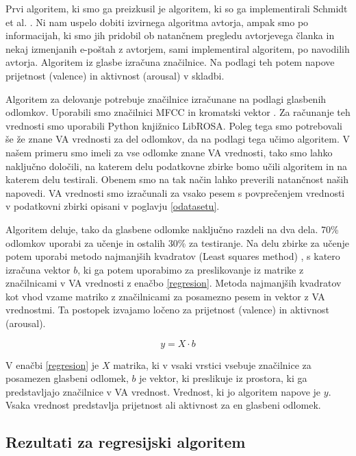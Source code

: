 \documentclass[a4paper, 12pt]{book}
\begin{document}
{Prvi algoritem, ki smo ga preizkusil je algoritem, ki so ga implementirali Schmidt et al. \cite{schmidt2009projection}. Ni nam uspelo dobiti izvirnega algoritma avtorja, ampak smo po informacijah, ki smo jih pridobil ob natančnem pregledu avtorjevega članka in nekaj izmenjanih e-poštah z avtorjem, sami implementiral algoritem, po navodilih avtorja. Algoritem iz glasbe izračuna značilnice. Na podlagi teh potem napove prijetnost (valence) in aktivnost (arousal) v skladbi. 

Algoritem za delovanje potrebuje značilnice izračunane na podlagi glasbenih odlomkov. Uporabili smo značilnici MFCC \cite{logan2000mel} in kromatski vektor \cite{Bello2005}. Za računanje teh vrednosti smo uporabili Python knjižnico LibROSA. Poleg tega smo potrebovali še že znane VA vrednosti za del odlomkov, da na podlagi tega učimo algoritem. V našem primeru smo imeli za vse odlomke znane VA vrednosti, tako smo lahko naključno določili, na katerem delu podatkovne zbirke bomo učili algoritem in na katerem delu testirali. Obenem smo na tak način lahko preverili natančnost naših napovedi. VA vrednosti smo izračunali za vsako pesem s povprečenjem vrednosti v podatkovni zbirki opisani v poglavju \ref{odatasetu}.

Algoritem deluje, tako da glasbene odlomke naključno razdeli na dva dela. 70\% odlomkov uporabi za učenje in ostalih 30\% za testiranje. Na delu zbirke za učenje potem uporabi metodo najmanjših kvadratov (Least squares method) \cite{abdi2007method}, s katero izračuna vektor $b$, ki ga potem uporabimo za preslikovanje iz matrike z značilnicami v VA vrednosti z enačbo \ref{regresion}. Metoda najmanjših kvadratov kot vhod vzame matriko z značilnicami za posamezno pesem in vektor z VA vrednostmi. Ta postopek izvajamo ločeno za prijetnost (valence) in aktivnost (arousal).  

\begin{equation} 
\label{regresion}
y = X \cdot b
\end{equation} 

V enačbi \ref{regresion} je $X$ matrika, ki v vsaki vrstici vsebuje značilnice za posamezen glasbeni odlomek, $b$ je vektor, ki preslikuje iz prostora, ki ga predstavljajo značilnice v VA vrednost. Vrednost, ki jo algoritem napove je $y$. Vsaka vrednost predstavlja prijetnost ali aktivnost za en glasbeni odlomek. 

\subsection{Rezultati za regresijski algoritem}

}
\end{document}
